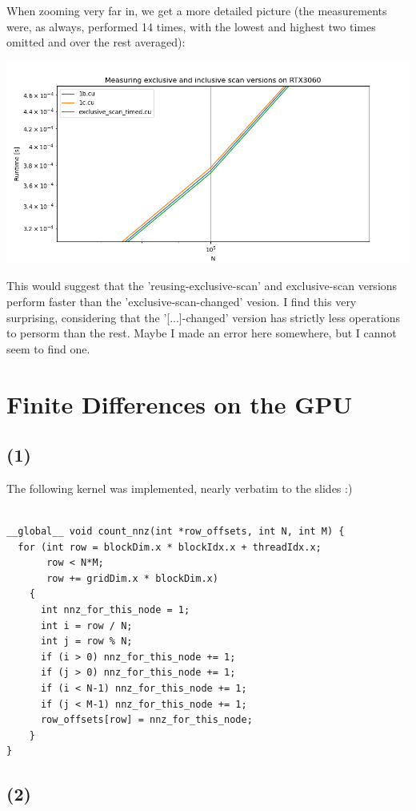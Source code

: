 \documentclass[11pt]{article}
\begin{document}
When zooming very far in, we get a more detailed picture (the measurements were, as always, performed 14 times, with the lowest and highest two times omitted and over the rest averaged):

\includegraphics[scale=0.5]{plots/1zoom.png}

This would suggest that the 'reusing-exclusive-scan' and exclusive-scan versions perform faster than the 'exclusive-scan-changed' vesion. I find this very surprising, considering that the '[...]-changed' version has strictly less operations to persorm than the rest. Maybe I made an error here somewhere, but I cannot seem to find one.
\pagebreak
\section{Finite Differences on the GPU}

\subsection{(1)}

The following kernel was implemented, nearly verbatim to the slides :)

\begin{verbatim}

__global__ void count_nnz(int *row_offsets, int N, int M) {
  for (int row = blockDim.x * blockIdx.x + threadIdx.x;
       row < N*M;
       row += gridDim.x * blockDim.x)
    {
      int nnz_for_this_node = 1;
      int i = row / N;
      int j = row % N;
      if (i > 0) nnz_for_this_node += 1;
      if (j > 0) nnz_for_this_node += 1;
      if (i < N-1) nnz_for_this_node += 1;
      if (j < M-1) nnz_for_this_node += 1;
      row_offsets[row] = nnz_for_this_node;
    }
}

\end{verbatim}

\subsection{(2)}
\end{document}
